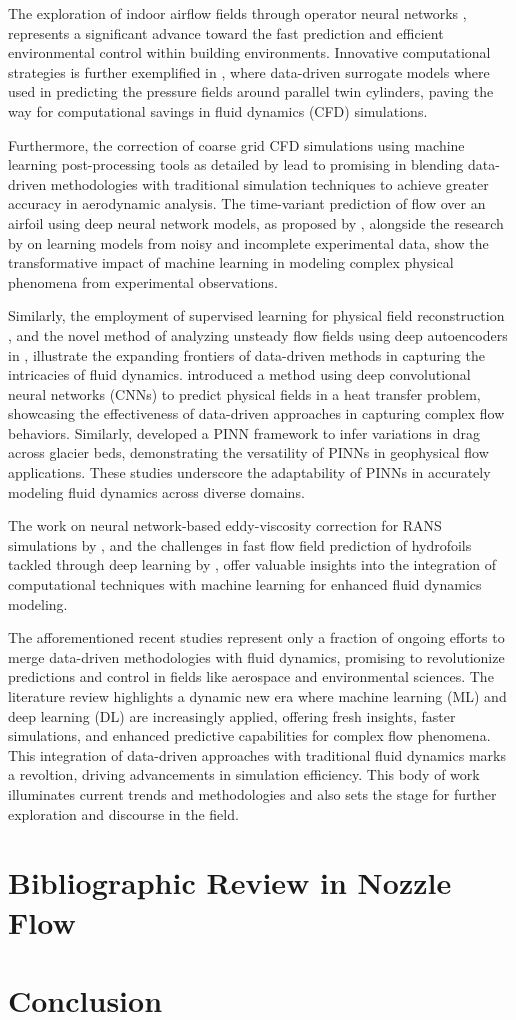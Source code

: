 The exploration of indoor airflow fields through operator neural networks \cite{Gao2024}, represents a significant advance toward the fast prediction and efficient environmental control within building environments. Innovative computational strategies is further exemplified in \citet{Min2024}, where data-driven surrogate models where used in predicting the pressure fields around parallel twin cylinders, paving the way for computational savings in fluid dynamics (CFD) simulations.

Furthermore, the correction of coarse grid CFD simulations using machine learning post-processing tools as detailed by \citet{Kiener2023} lead to promising in blending data-driven methodologies with traditional simulation techniques to achieve greater accuracy in aerodynamic analysis. The time-variant prediction of flow over an airfoil using deep neural network models, as proposed by \cite{Peng2020b}, alongside the research by \citet{Reinbold2021d} on learning models from noisy and incomplete experimental data, show the transformative impact of machine learning in modeling complex physical phenomena from experimental observations.

Similarly, the employment of supervised learning for physical field reconstruction \cite{Liu2021c}, and the novel method of analyzing unsteady flow fields using deep autoencoders in \cite{Omata2019c}, illustrate the expanding frontiers of data-driven methods in capturing the intricacies of fluid dynamics. \citet{Liu2021c} introduced a method using deep convolutional neural networks (CNNs) to predict physical fields in a heat transfer problem, showcasing the effectiveness of data-driven approaches in capturing complex flow behaviors. Similarly, \citet{Riel2021c} developed a PINN framework to infer variations in drag across glacier beds, demonstrating the versatility of PINNs in geophysical flow applications. These studies underscore the adaptability of PINNs in accurately modeling fluid dynamics across diverse domains.

The work on neural network-based eddy-viscosity correction for RANS simulations by \cite{Volpiani2022}, and the challenges in fast flow field prediction of hydrofoils tackled through deep learning by \cite{Li2023}, offer valuable insights into the integration of computational techniques with machine learning for enhanced fluid dynamics modeling.

The afforementioned recent studies represent only a fraction of ongoing efforts to merge data-driven methodologies with fluid dynamics, promising to revolutionize predictions and control in fields like aerospace and environmental sciences. The literature review highlights a dynamic new era where machine learning (ML) and deep learning (DL) are increasingly applied, offering fresh insights, faster simulations, and enhanced predictive capabilities for complex flow phenomena. This integration of data-driven approaches with traditional fluid dynamics marks a revoltion, driving advancements in simulation efficiency. This body of work illuminates current trends and methodologies and also sets the stage for further exploration and discourse in the field.


\section{Bibliographic Review in Nozzle Flow}

\section{Conclusion}